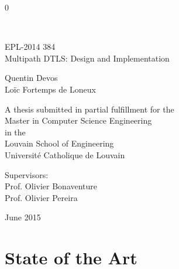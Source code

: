 \documentclass[11pt,a4paper,oldfontcommands]{memoir}
\newcommand\draft{0}
\begin{document}
%
%
\draft
\thispagestyle{empty}

{%
\sffamily
\centering
\Large

~\vspace{\fill}

EPL-2014 384\\
{\huge 
Multipath DTLS: Design and Implementation
}

\vspace{2.5cm}

{\LARGE
Quentin Devos \\
Loïc Fortemps de Loneux
}

\vspace{3.5cm}

A thesis submitted in partial fulfillment for the\\
Master in Computer Science Engineering\\[1em]
in the\\[1em]
Louvain School of Engineering\\
Université Catholique de Louvain

\vspace{3.5cm}

Supervisors: \\
Prof. Olivier Bonaventure\\
Prof. Olivier Pereira

\vspace{\fill}

June 2015

}%

\cleardoublepage

\tableofcontents*
\clearpage

\listoffigures*
\clearpage

\lstlistoflistings*
\clearpage



\markboth{}{}
\part{State of the Art}
\end{document}
